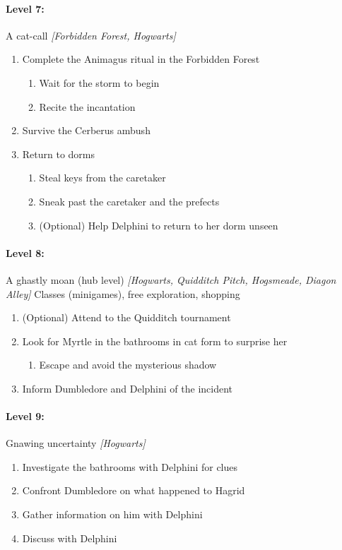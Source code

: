 \paragraph{Level 7:} A cat-call \textit{[Forbidden Forest, Hogwarts]}
\begin{enumerate}[1)]
	\item Complete the Animagus ritual in the Forbidden Forest
	\begin{enumerate}[1.]
		\item Wait for the storm to begin
		\item Recite the incantation
	\end{enumerate}
	\item Survive the Cerberus ambush
	\item Return to dorms
	\begin{enumerate}[1.]
		\item Steal keys from the caretaker
		\item Sneak past the caretaker and the prefects
		\item (Optional) Help Delphini to return to her dorm unseen
	\end{enumerate}
\end{enumerate}

\paragraph{Level 8:} A ghastly moan (hub level) \textit{[Hogwarts, Quidditch Pitch, Hogsmeade, Diagon Alley]}
Classes (minigames), free exploration, shopping

\begin{enumerate}[1)]
	\item (Optional) Attend to the Quidditch tournament
	\item Look for Myrtle in the bathrooms in cat form to surprise her
	\begin{enumerate}[1.]
		\item Escape and avoid the mysterious shadow
	\end{enumerate}
	\item Inform Dumbledore and Delphini of the incident
\end{enumerate}

\paragraph{Level 9:} Gnawing uncertainty \textit{[Hogwarts]}
\begin{enumerate}[1)]
	\item Investigate the bathrooms with Delphini for clues
	\item Confront Dumbledore on what happened to Hagrid
	\item Gather information on him with Delphini
	\item Discuss with Delphini
\end{enumerate}

